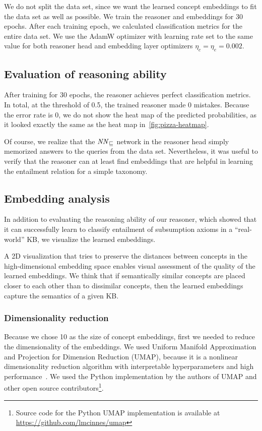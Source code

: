 We do not split the data set, since we want the learned concept embeddings to fit the data set as well as possible.
We train the reasoner and embeddings for 30 epochs.
After each training epoch, we calculated classification metrics for the entire data set.
We use the AdamW optimizer with learning rate set to the same value for both reasoner head and embedding layer optimizers $\eta_c = \eta_e = 0.002$.

\subsection{Evaluation of reasoning ability}

After training for 30 epochs, the reasoner achieves perfect classification metrics.
In total, at the threshold of 0.5, the trained reasoner made 0 mistakes.
Because the error rate is 0, we do not show the heat map of the predicted probabilities, as it looked exactly the same as the heat map in~\autoref{fig:pizza-heatmap}.

Of course, we realize that the $\mathit{NN}_\sqsubseteq$ network in the reasoner head simply memorized answers to the queries from the data set.
Nevertheless, it was useful to verify that the reasoner can at least find embeddings that are helpful in learning the entailment relation for a simple taxonomy.


\subsection{Embedding analysis}
\label{sec:pizzaviz}

In addition to evaluating the reasoning ability of our reasoner, which showed that it can successfully learn to classify entailment of subsumption axioms in a ``real-world'' KB, we visualize the learned embeddings.

A 2D visualization that tries to preserve the distances between concepts in the high-dimensional embedding space enables visual assessment of the quality of the learned embeddings.
We think that if semantically similar concepts are placed closer to each other than to dissimilar concepts, then the learned embeddings capture the semantics of a given KB.

\subsubsection{Dimensionality reduction}

Because we chose 10 as the size of concept embeddings, first we needed to reduce the dimensionality of the embeddings.
We used Uniform Manifold Approximation and Projection for Dimension Reduction (UMAP), because it is a nonlinear dimensionality reduction algorithm with interpretable hyperparameters and high performance~\cite{mcinnes_umap_2020}.
We used the Python implementation by the authors of UMAP and other open source contributors\footnote{Source code for the Python UMAP implementation is available at \url{https://github.com/lmcinnes/umap}}.

